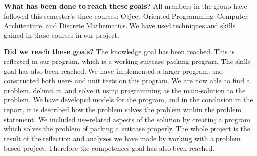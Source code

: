 \textbf{What has been done to reach these goals?} \newline
All members in the group have followed this semester's three courses: Object Oriented Programming, Computer Architecture, and Discrete Mathematics. We have used techniques and skills gained in these courses in our project.

\textbf{Did we reach these goals?} \newline
	The knowledge goal has been reached. This is reflected in our program, which is a working suitcase packing program. The skills goal has also been reached. We have implemented a larger program, and constructed both user- and unit tests on this program. We are now able to find a problem, delimit it, and solve it using programming as the main-solution to the problem. We have developed models for the program, and in the conclusion in the report, it is described how the problem solves the problem within the problem statement. We included use-related aspects of the solution by creating a program which solves the problem of packing a suitcase properly. The whole project is the result of the reflection and analyzes we have made by working with a problem based project. Therefore the competences goal has also been reached. 




